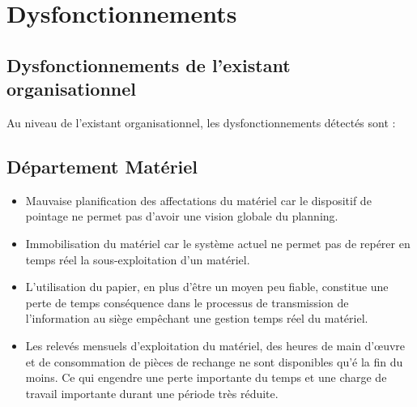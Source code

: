		
		
\section{Dysfonctionnements}	
	\subsection{Dysfonctionnements de l'existant organisationnel}
		Au niveau de l'existant organisationnel, les dysfonctionnements détectés sont :
		
		\subsection{Département Matériel}
				\begin{itemize}
						\item Mauvaise planification des affectations du matériel car le dispositif de pointage ne permet pas d'avoir une vision globale du planning.
						\item Immobilisation du matériel car le système actuel ne permet pas de repérer en temps réel la sous-exploitation d'un matériel.
						\item L'utilisation du papier, en plus d'être un moyen peu fiable, constitue une perte de temps conséquence dans le processus de transmission de l'information au siège empêchant une gestion temps réel du matériel.
						\item Les relevés mensuels d'exploitation du matériel, des heures de main d'œuvre et de consommation de pièces de rechange ne sont disponibles qu'é la fin du moins. Ce qui engendre une perte importante du temps et une charge de travail importante durant une période très réduite.
				\end{itemize}
		
